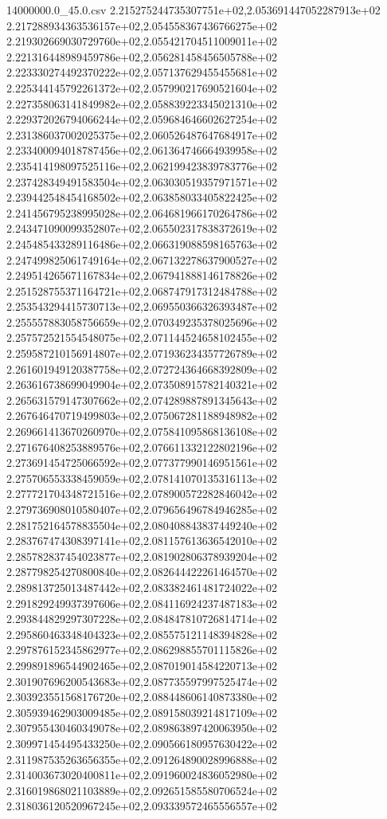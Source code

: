 \begin{filecontents*}{14000000.0_45.0.csv}
2.215275244735307751e+02,2.053691447052287913e+02
2.217288934363536157e+02,2.054558367436766275e+02
2.219302669030729760e+02,2.055421704511009011e+02
2.221316448989459786e+02,2.056281458456505788e+02
2.223330274492370222e+02,2.057137629455455681e+02
2.225344145792261372e+02,2.057990217690521604e+02
2.227358063141849982e+02,2.058839223345021310e+02
2.229372026794066244e+02,2.059684646602627254e+02
2.231386037002025375e+02,2.060526487647684917e+02
2.233400094018787456e+02,2.061364746664939958e+02
2.235414198097525116e+02,2.062199423839783776e+02
2.237428349491583504e+02,2.063030519357971571e+02
2.239442548454168502e+02,2.063858033405822425e+02
2.241456795238995028e+02,2.064681966170264786e+02
2.243471090099352807e+02,2.065502317838372619e+02
2.245485433289116486e+02,2.066319088598165763e+02
2.247499825061749164e+02,2.067132278637900527e+02
2.249514265671167834e+02,2.067941888146178826e+02
2.251528755371164721e+02,2.068747917312484788e+02
2.253543294415730713e+02,2.069550366326393487e+02
2.255557883058756659e+02,2.070349235378025696e+02
2.257572521554548075e+02,2.071144524658102455e+02
2.259587210156914807e+02,2.071936234357726789e+02
2.261601949120387758e+02,2.072724364668392809e+02
2.263616738699049904e+02,2.073508915782140321e+02
2.265631579147307662e+02,2.074289887891345643e+02
2.267646470719499803e+02,2.075067281188948982e+02
2.269661413670260970e+02,2.075841095868136108e+02
2.271676408253889576e+02,2.076611332122802196e+02
2.273691454725066592e+02,2.077377990146951561e+02
2.275706553338459059e+02,2.078141070135316113e+02
2.277721704348721516e+02,2.078900572282846042e+02
2.279736908010580407e+02,2.079656496784946285e+02
2.281752164578835504e+02,2.080408843837449240e+02
2.283767474308397141e+02,2.081157613636542010e+02
2.285782837454023877e+02,2.081902806378939204e+02
2.287798254270800840e+02,2.082644422261464570e+02
2.289813725013487442e+02,2.083382461481724022e+02
2.291829249937397606e+02,2.084116924237487183e+02
2.293844829297307228e+02,2.084847810726814714e+02
2.295860463348404323e+02,2.085575121148394828e+02
2.297876152345862977e+02,2.086298855701115826e+02
2.299891896544902465e+02,2.087019014584220713e+02
2.301907696200543683e+02,2.087735597997525474e+02
2.303923551568176720e+02,2.088448606140873380e+02
2.305939462903009485e+02,2.089158039214817109e+02
2.307955430460349078e+02,2.089863897420063950e+02
2.309971454495433250e+02,2.090566180957630422e+02
2.311987535263656355e+02,2.091264890028996888e+02
2.314003673020400811e+02,2.091960024836052980e+02
2.316019868021103889e+02,2.092651585580706524e+02
2.318036120520967245e+02,2.093339572465556557e+02

\end{filecontents*}
